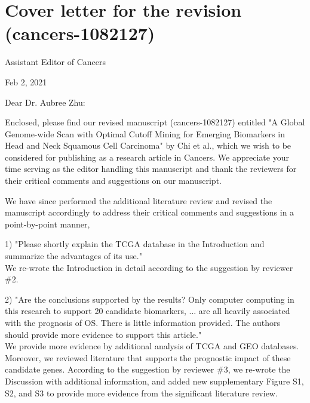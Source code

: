 \documentclass[preprint,12pt]{elsarticle}
\begin{document}
\section*{Cover letter for the revision (cancers-1082127)} %
 

Assistant Editor of Cancers%

Feb 2, 2021

Dear Dr. Aubree Zhu:

Enclosed, please find our revised manuscript (cancers-1082127) entitled "A Global Genome-wide Scan with Optimal Cutoff Mining for Emerging Biomarkers in Head and Neck Squamous Cell Carcinoma" by Chi et al., which we wish to be considered for publishing as a research article in Cancers. We appreciate your time serving as the editor handling this manuscript and thank the reviewers for their critical comments and suggestions on our manuscript.

We have since performed the additional literature review and revised the manuscript accordingly to address their critical comments and suggestions in a point-by-point manner, 


1) %
"Please shortly explain the TCGA database in the Introduction and summarize the advantages of its use."\\
We re-wrote the Introduction in detail according to the suggestion by reviewer \#2. %

2) %
"Are the conclusions supported by the results?
Only computer computing in this research to support 20 candidate biomarkers, ... are all heavily associated with the prognosis of OS.
There is little information provided. The authors should provide more evidence to support this article."\\
We provide more evidence by additional analysis of TCGA and GEO databases. Moreover, we reviewed literature that supports the prognostic impact of these candidate genes.
According to the suggestion by reviewer \#3,
we re-wrote the Discussion with additional information, and
added new supplementary Figure S1, S2, and S3 %
to provide more evidence from the significant literature review.
\end{document}
